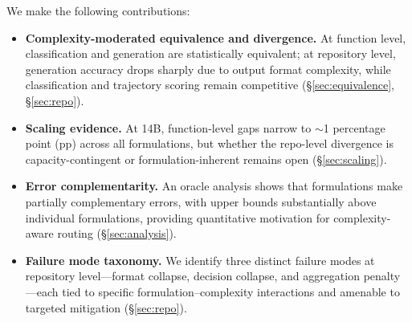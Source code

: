 We make the following contributions:

\begin{itemize}[leftmargin=*,itemsep=2pt]
\item \textbf{Complexity-moderated equivalence and divergence.} At function level, classification and generation are statistically equivalent; at repository level, generation accuracy drops sharply due to output format complexity, while classification and trajectory scoring remain competitive (\S\ref{sec:equivalence}, \S\ref{sec:repo}).

\item \textbf{Scaling evidence.} At 14B, function-level gaps narrow to ${\sim}$1 percentage point (pp) across all formulations, but whether the repo-level divergence is capacity-contingent or formulation-inherent remains open (\S\ref{sec:scaling}).

\item \textbf{Error complementarity.} An oracle analysis shows that formulations make partially complementary errors, with upper bounds substantially above individual formulations, providing quantitative motivation for complexity-aware routing (\S\ref{sec:analysis}).

\item \textbf{Failure mode taxonomy.} We identify three distinct failure modes at repository level---format collapse, decision collapse, and aggregation penalty---each tied to specific formulation--complexity interactions and amenable to targeted mitigation (\S\ref{sec:repo}).
\end{itemize}
